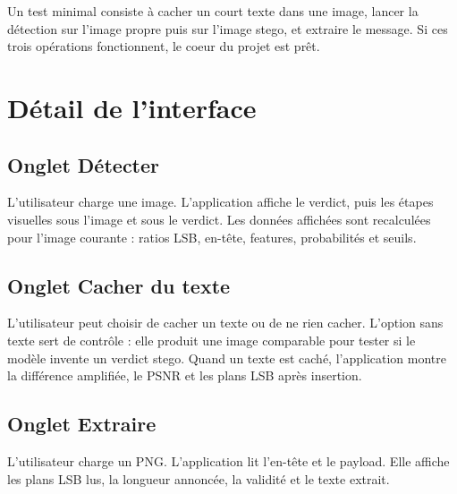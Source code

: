 \documentclass[11pt,a4paper]{article}
\begin{document}
Un test minimal consiste à cacher un court texte dans une image, lancer la détection sur l'image propre puis sur l'image stego, et extraire le message. Si ces trois opérations fonctionnent, le coeur du projet est prêt.

\section{Détail de l'interface}
\subsection{Onglet Détecter}
L'utilisateur charge une image. L'application affiche le verdict, puis les étapes visuelles sous l'image et sous le verdict. Les données affichées sont recalculées pour l'image courante : ratios LSB, en-tête, features, probabilités et seuils.

\subsection{Onglet Cacher du texte}
L'utilisateur peut choisir de cacher un texte ou de ne rien cacher. L'option sans texte sert de contrôle : elle produit une image comparable pour tester si le modèle invente un verdict stego. Quand un texte est caché, l'application montre la différence amplifiée, le PSNR et les plans LSB après insertion.

\subsection{Onglet Extraire}
L'utilisateur charge un PNG. L'application lit l'en-tête et le payload. Elle affiche les plans LSB lus, la longueur annoncée, la validité et le texte extrait.
\end{document}
